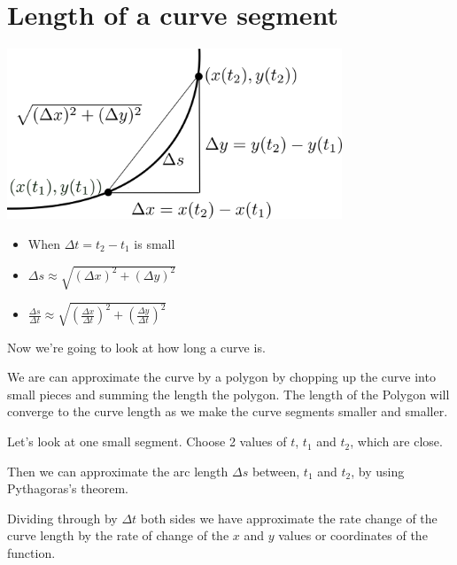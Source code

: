 \documentclass[]{article} %
\theoremstyle{definition}
\theoremstyle{theorem}
\begin{document}
\section{Length of a curve segment}
\begin{tcolorbox}
	\begin{minipage}{\linewidth}
		\centering
		\includegraphics[width=100mm]{curve_length_2.png}
	\end{minipage}
	\begin{itemize}
		\item When $\Delta t = t_2 - t_1$ is small
		\item $\Delta s \approx	\sqrt{\left(\Delta x\right)^2 + \left(\Delta y\right)^2} $
		\item $\frac{\Delta s}{\Delta t} \approx	\sqrt{\left(\frac{\Delta x}{\Delta t}\right)^2 + \left(\frac{\Delta y}{\Delta t}\right)^2 } $
	\end{itemize}
\end{tcolorbox}

Now we're going to look at how long a curve is. 

We are can approximate the curve by a polygon by chopping up the curve into small pieces and summing the length the polygon. The length of the Polygon will converge to the curve length as we make the curve segments smaller and smaller.

Let's look at one small segment.  Choose 2 values of $t$,  $t_1$ and $t_2$, which are close. 

Then we can approximate the arc length $\Delta s$ between,  $t_1$ and $t_2$, by using Pythagoras’s theorem.

Dividing through by $\Delta t$ both sides we have approximate the rate change of the curve length by the rate of change of the $x$ and $y$ values or coordinates of the function.
\end{document}
